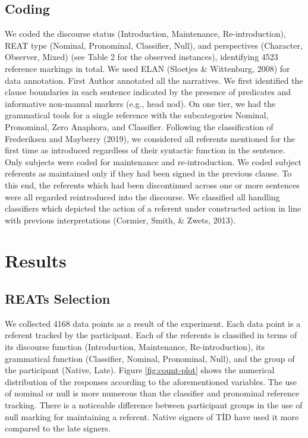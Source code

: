 \documentclass[
  english,
  doc,mask]{apa6}
\begin{document}
\hypertarget{coding}{%
\subsection{Coding}\label{coding}}

We coded the discourse status (Introduction, Maintenance, Re-introduction), REAT type (Nominal, Pronominal, Classifier, Null), and perspectives (Character, Observer, Mixed) (see Table 2 for the observed instances), identifying 4523 reference markings in total. We used ELAN (Sloetjes \& Wittenburg, 2008) for data annotation. First Author annotated all the narratives. We first identified the clause boundaries in each sentence indicated by the presence of predicates and informative non-manual markers (e.g., head nod). On one tier, we had the grammatical tools for a single reference with the subcategories Nominal, Pronominal, Zero Anaphora, and Classifier. Following the classification of Frederiksen and Mayberry (2019), we considered all referents mentioned for the first time as introduced regardless of their syntactic function in the sentence. Only subjects were coded for maintenance and re-introduction. We coded subject referents as maintained only if they had been signed in the previous clause. To this end, the referents which had been discontinued across one or more sentences were all regarded reintroduced into the discourse. We classified all handling classifiers which depicted the action of a referent under constructed action in line with previous interpretations (Cormier, Smith, \& Zwets, 2013).

\hypertarget{results}{%
\section{Results}\label{results}}

\hypertarget{reats-selection-1}{%
\subsection{REATs Selection}\label{reats-selection-1}}

We collected 4168 data points as a result of the experiment. Each data point is a referent tracked by the participant. Each of the referents is classified in terms of its discourse function (Introduction, Maintenance, Re-introduction), its grammatical function (Classifier, Nominal, Pronominal, Null), and the group of the participant (Native, Late). Figure \ref{fig:count-plot} shows the numerical distribution of the responses according to the aforementioned variables. The use of nominal or null is more numerous than the classifier and pronominal reference tracking. There is a noticeable difference between participant groups in the use of null marking for maintaining a referent. Native signers of TİD have used it more compared to the late signers.
\end{document}
